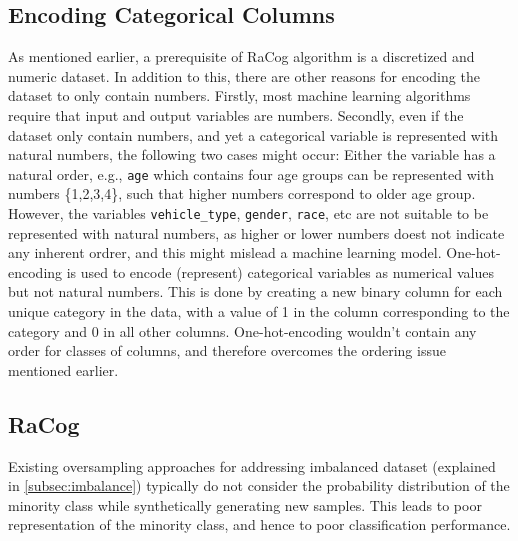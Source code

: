 \documentclass{article}
\begin{document}
\hypertarget{encoding-categorical-columns}{%
\subsection{\texorpdfstring{Encoding Categorical Columns
\label{subsec:encode}}{Encoding Categorical Columns }}\label{encoding-categorical-columns}}

As mentioned earlier, a prerequisite of RaCog algorithm is a discretized
and numeric dataset. In addition to this, there are other reasons for
encoding the dataset to only contain numbers. Firstly, most machine
learning algorithms require that input and output variables are numbers.
Secondly, even if the dataset only contain numbers, and yet a
categorical variable is represented with natural numbers, the following
two cases might occur: Either the variable has a natural order, e.g.,
\texttt{age} which contains four age groups can be represented with
numbers \{1,2,3,4\}, such that higher numbers correspond to older age
group. However, the variables \texttt{vehicle\_type}, \texttt{gender},
\texttt{race}, etc are not suitable to be represented with natural
numbers, as higher or lower numbers doest not indicate any inherent
ordrer, and this might mislead a machine learning model.
One-hot-encoding is used to encode (represent) categorical variables as
numerical values but not natural numbers. This is done by creating a new
binary column for each unique category in the data, with a value of 1 in
the column corresponding to the category and 0 in all other columns.
One-hot-encoding wouldn't contain any order for classes of columns, and
therefore overcomes the ordering issue mentioned earlier.

\hypertarget{racog}{%
\subsection{\texorpdfstring{RaCog
\label{subsec:racog}}{RaCog }}\label{racog}}

Existing oversampling approaches for addressing imbalanced dataset
(explained in \ref{subsec:imbalance}) typically do not consider the
probability distribution of the minority class while synthetically
generating new samples. This leads to poor representation of the
minority class, and hence to poor classification performance.
\end{document}
